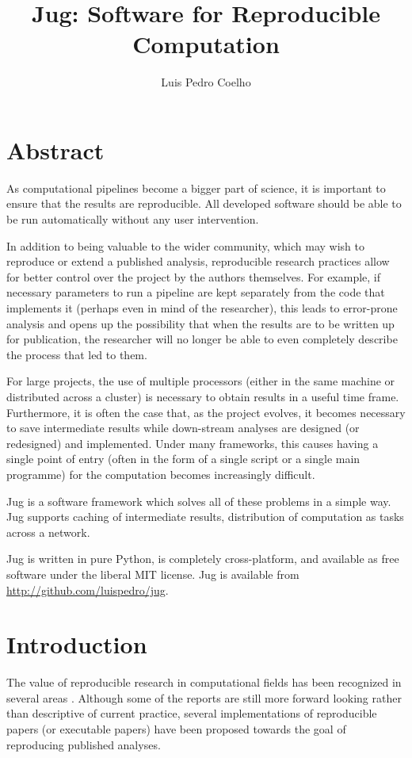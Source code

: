 \documentclass{article}
\title{Jug: Software for Reproducible Computation}
\author{Luis Pedro Coelho}
\begin{document}
\maketitle

\section*{Abstract}
As computational pipelines become a bigger part of science, it is important to
ensure that the results are reproducible. All developed software should be able
to be run automatically without any user intervention.

In addition to being valuable to the wider community, which may wish to
reproduce or extend a published analysis, reproducible research practices allow
for better control over the project by the authors themselves. For example, if
necessary parameters to run a pipeline are kept separately from the code that
implements it (perhaps even in mind of the researcher), this leads to
error-prone analysis and opens up the possibility that when the results are to
be written up for publication, the researcher will no longer be able to even
completely describe the process that led to them.

For large projects, the use of multiple processors (either in the same machine
or distributed across a cluster) is necessary to obtain results in a useful
time frame. Furthermore, it is often the case that, as the project evolves, it
becomes necessary to save intermediate results while down-stream analyses are
designed (or redesigned) and implemented. Under many frameworks, this causes
having a single point of entry (often in the form of a single script or a
single main programme) for the computation becomes increasingly difficult.

Jug is a software framework which solves all of these problems in a simple way.
Jug supports caching of intermediate results, distribution of computation as
tasks across a network.

Jug is written in pure Python, is completely cross-platform, and available as
free software under the liberal MIT license. Jug is available from
\url{http://github.com/luispedro/jug}.
\bigskip
\bigskip

\section{Introduction}
The value of reproducible research in computational fields has been recognized
in several areas \citep{Vandewalle2009,Nordlie2009}. Although some of the
reports are still more forward looking rather than descriptive of current
practice, several implementations of reproducible papers (or executable papers)
have been proposed towards the goal of reproducing published analyses.
\end{document}
